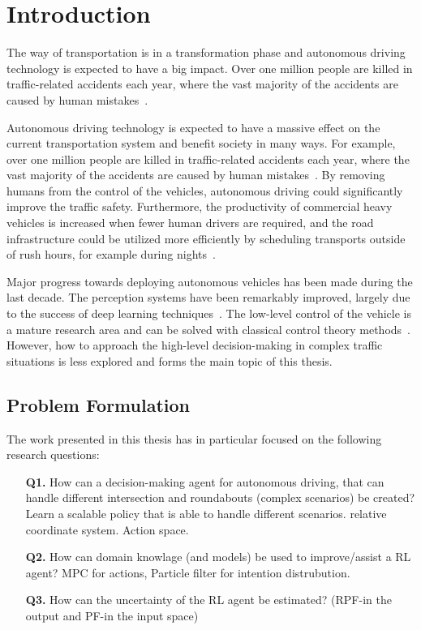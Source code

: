 \chapter{Introduction}\label{chapter:intro}
The way of transportation is in a transformation phase and autonomous driving technology is expected to have a big impact. Over one million people are killed in traffic-related accidents each year, where the vast majority of the accidents are caused by human mistakes~\cite{WHO2018, NHTSA2018}. 

Autonomous driving technology is expected to have a massive effect on the current transportation system and benefit society in many ways. For example, over one million people are killed in traffic-related accidents each year, where the vast majority of the accidents are caused by human mistakes~\cite{WHO2018, NHTSA2018}. By removing humans from the control of the vehicles, autonomous driving could significantly improve the traffic safety. Furthermore, the productivity of commercial heavy vehicles is increased when fewer human drivers are required, and the road infrastructure could be utilized more efficiently by scheduling transports outside of rush hours, for example during nights~\cite{FAGNANT2015167}.

Major progress towards deploying autonomous vehicles has been made during the last decade. The perception systems have been remarkably improved, largely due to the success of deep learning techniques~\cite{Janai2020}. The low-level control of the vehicle is a mature research area and can be solved with classical control theory methods~\cite{Paden2016}. However, how to approach the high-level decision-making in complex traffic situations is less explored and forms the main topic of this thesis.

\section{Problem Formulation}
The work presented in this thesis has in particular focused on the following research questions:
\begin{enumerate}
	\item[\textbf{Q1.}] How can a decision-making agent for autonomous driving, that can handle different intersection and roundabouts (complex scenarios) be created? Learn a scalable policy that is able to handle different scenarios. relative coordinate system. Action space. 
	\item[\textbf{Q2.}] How can domain knowlage (and models) be used to improve/assist a RL agent? MPC for actions, Particle filter for intention distrubution. 
	\item[\textbf{Q3.}] How can the uncertainty of the RL agent be estimated? (RPF-in the output and PF-in the input space)
\end{enumerate}



